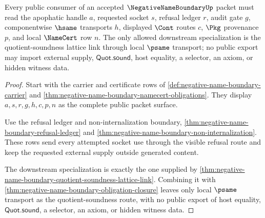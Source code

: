 \begin{theorem}
\label{thm:negative-name-boundary-public-export}
Every public consumer of an accepted $\NegativeNameBoundaryUp$ packet must read the apophatic handle $a$, requested socket $s$, refusal ledger $r$, audit gate $g$, componentwise $\hsame$ transports $h$, displayed $\Cont$ routes $c$, $\Pkg$ provenance $p$, and local $\NameCert$ row $n$. The only allowed downstream specialization is the quotient-soundness lattice link through local $\psame$ transport; no public export may import external supply, $\mathsf{Quot.sound}$, host equality, a selector, an axiom, or hidden witness data.
\end{theorem}
\begin{proof}
Start with the carrier and certificate rows of \autoref{def:negative-name-boundary-carrier} and \autoref{thm:negative-name-boundary-namecert-obligations}. They display $a,s,r,g,h,c,p,n$ as the complete public packet surface.

Use the refusal ledger and non-internalization boundary, \autoref{thm:negative-name-boundary-refusal-ledger} and \autoref{thm:negative-name-boundary-non-internalization}. These rows send every attempted socket use through the visible refusal route and keep the requested external supply outside generated content.

The downstream specialization is exactly the one supplied by \autoref{thm:negative-name-boundary-quotient-soundness-lattice-link}. Combining it with \autoref{thm:negative-name-boundary-obligation-closure} leaves only local $\psame$ transport as the quotient-soundness route, with no public export of host equality, $\mathsf{Quot.sound}$, a selector, an axiom, or hidden witness data.
\end{proof}


